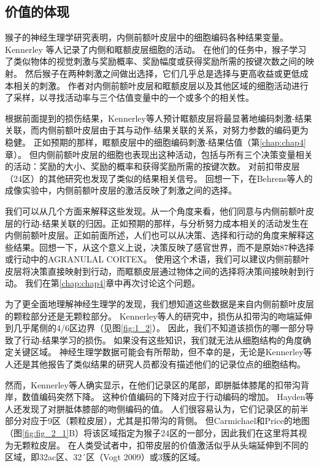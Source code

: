 \subsection{价值的体现}
猴子的神经生理学研究表明，内侧前额叶皮层中的细胞编码各种结果变量。 Kennerley 等人\cite{kennerley2009evaluating}记录了内侧和眶额皮层细胞的活动。
在他们的任务中，猴子学习了类似物体的视觉刺激与奖励概率、奖励幅度或获得奖励所需的按键次数之间的映射。
然后猴子在两种刺激之间做出选择，它们几乎总是选择与更高收益或更低成本相关的刺激。
作者对内侧前额叶皮层和眶额皮层以及其他区域的细胞活动进行了采样，以寻找活动率与三个估值变量中的一个或多个的相关性。\par
根据前面提到的损伤结果，Kennerley等人预计眶额皮层将最显著地编码刺激-结果关联，而内侧前额叶皮层由于其与动作-结果关联的关系，对努力参数的编码更为稳健。
正如预期的那样，眶额皮层中的细胞编码刺激-结果估值（第\ref{chap:chap4}章）。
但内侧前额叶皮层的细胞也表现出这种活动，包括与所有三个决策变量相关的活动：奖励的大小、奖励的概率和获得奖励所需的按键次数。
对前扣带皮层（24区）的其他研究也发现了类似的结果相关信号\cite{seo2007temporal,hayden2010neurons}。
回想一下，在Behrens等人\cite{behrens2007learning}的成像实验中，内侧前额叶皮层的激活反映了刺激之间的选择。\par
我们可以从几个方面来解释这些发现。从一个角度来看，他们同意与内侧前额叶皮层的行动-结果关联的归因。正如预期的那样，与分析努力成本相关的活动发生在内侧前额叶皮层。正如前面所述，人们也可以从决策、选择和行动的角度来解释这些结果。回想一下，从这个意义上说，决策反映了感官世界，而不是原始87种选择或行动中的AGRANULAL CORTEX\cite{schall1991neuronal}。
使用这个术语，我们可以建议内侧前额叶皮层将决策直接映射到行动，而眶额皮层通过物体之间的选择将决策间接映射到行动。
我们在第\ref{chap:chap4}章中再次讨论这个问题。\par
为了更全面地理解神经生理学的发现，我们想知道这些数据是来自内侧前额叶皮层的颗粒部分还是无颗粒部分。
Kennerley等人\cite{kennerley2006optimal}的研究中，损伤从扣带沟的吻端延伸到几乎尾侧的4/6区边界（见图\ref{fig:1_2}）。
因此，我们不知道该损伤的哪一部分导致了行动-结果学习的损伤。
如果没有这些知识，我们就无法从细胞结构的角度确定关键区域。
神经生理学数据可能会有所帮助，但不幸的是，无论是Kennerley等人\cite{kennerley2009evaluating}还是其他报告了类似结果的研究人员\cite{seo2007temporal,hayden2011neuronal}都没有描述他们的记录位点的细胞结构。\par


然而，Kennerley等人确实显示，在他们记录区的尾部，即胼胝体膝尾的扣带沟背岸，数值编码突然下降。
这种价值编码的下降对应于行动编码的增加。
Hayden等人还发现了对胼胝体膝部的吻侧编码的值。
人们很容易认为，它们记录区的前半部分对应于9区（颗粒皮层），尤其是扣带沟的背侧。
但Carmichael和Price的地图（图\ref{fig:fig_2_1}B）将该区域指定为猴子24区的一部分，因此我们在这里将其视为无颗粒皮层。
在人类受试者中，扣带皮层的价值激活似乎从头端延伸到不同的区域，即32ac区\cite{Öngür et al. 2003}、32´区（Vogt 2009）或3簇\cite{Beckmann et al 2009}的区域。\par


